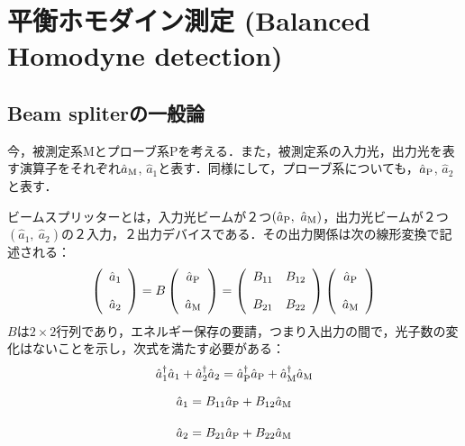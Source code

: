 
\section{平衡ホモダイン測定 (Balanced Homodyne detection)}
\subsection{Beam spliterの一般論}
今，被測定系Mとプローブ系Pを考える．また，被測定系の入力光，出力光を表す演算子をそれぞれ$\hat{a}_{\rm{M}}$, $\hat{a}_1$と表す．同様にして，プローブ系についても，$\hat{a}_{\rm{P}}$, $\hat{a}_2$と表す．

ビームスプリッターとは，入力光ビームが２つ$(\hat{a}_{\rm{P}},\ \hat{a}_{\rm{M}})$，出力光ビームが２つ$(\hat{a}_{1},\ \hat{a}_{2})$の２入力，２出力デバイスである．その出力関係は次の線形変換で記述される：
\begin{equation}
    \left(
        \begin{array}{c}
       \hat{a}_1\\[10pt]
       \hat{a}_2\\
        \end{array}
        \right)
        =B\left(
        \begin{array}{c}
       \hat{a}_{\rm{P}}\\[10pt]
       \hat{a}_{\rm{M}}\\
        \end{array}
        \right)
        =
        \left(
        \begin{array}{cc}
       B_{11}&B_{12}\\[10pt]
        B_{21}&B_{22} \\
        \end{array}
        \right)
        \left(
        \begin{array}{c}
       \hat{a}_{\rm{P}}\\[10pt]
       \hat{a}_{\rm{M}}\\
        \end{array}
        \right)
\end{equation}
$B$は$2\times2$行列であり，エネルギー保存の要請，つまり入出力の間で，光子数の変化はないことを示し，次式を満たす必要がある：
\begin{equation}\label{law_of_conservation}
    \hat{a}^{\dag}_1\hat{a}_1 + \hat{a}^{\dag}_2\hat{a}_2
    =\hat{a}^{\dag}_{\rm{P}}\hat{a}_{\rm{P}} + \hat{a}^{\dag}_{\rm{M}}\hat{a}_{\rm{M}}
\end{equation}

\begin{align}
    \hat{a}_1 &= B_{11}\hat{a}_{\rm{P}} + B_{12}\hat{a}_{\rm{M}}\\[10pt]
    \hat{a}_2 &= B_{21}\hat{a}_{\rm{P}} + B_{22}\hat{a}_{\rm{M}}
\end{align}

